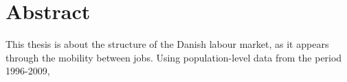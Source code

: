 
\chapter{Abstract \label{Abstrakt}}

This thesis is about the structure of the Danish labour market, as it appears through the mobility between jobs. Using population-level data from the period 1996-2009, 





